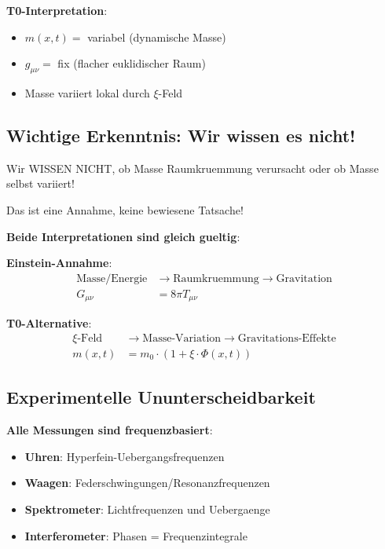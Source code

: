 \documentclass[12pt,a4paper]{article}
\newcommand{\xipar}{\xi}
\theoremstyle{definition}
\theoremstyle{remark}
\begin{document}
	\textbf{T0-Interpretation}:
	\begin{itemize}
		\item $m(x,t) = $ variabel (dynamische Masse)
		\item $g_{\mu\nu} = $ fix (flacher euklidischer Raum)
		\item Masse variiert lokal durch $\xipar$-Feld
	\end{itemize}
	
	\subsection{Wichtige Erkenntnis: Wir wissen es nicht!}
	
	\begin{tcolorbox}[colback=red!5!white,colframe=red!75!black,title=Achtung - Fundamentaler Punkt]
		Wir WISSEN NICHT, ob Masse Raumkruemmung verursacht oder ob Masse selbst variiert!
		
		Das ist eine Annahme, keine bewiesene Tatsache!
	\end{tcolorbox}
	
	\textbf{Beide Interpretationen sind gleich gueltig}:
	
	\textbf{Einstein-Annahme}:
	\begin{align}
		\text{Masse/Energie} &\rightarrow \text{Raumkruemmung} \rightarrow \text{Gravitation} \\
		G_{\mu\nu} &= 8\pi T_{\mu\nu}
	\end{align}
	
	\textbf{T0-Alternative}:
	\begin{align}
		\xipar\text{-Feld} &\rightarrow \text{Masse-Variation} \rightarrow \text{Gravitations-Effekte} \\
		m(x,t) &= m_0 \cdot (1 + \xipar \cdot \Phi(x,t))
	\end{align}
	
	\subsection{Experimentelle Ununterscheidbarkeit}
	
	\textbf{Alle Messungen sind frequenzbasiert}:
	\begin{itemize}
		\item \textbf{Uhren}: Hyperfein-Uebergangsfrequenzen
		\item \textbf{Waagen}: Federschwingungen/Resonanzfrequenzen
		\item \textbf{Spektrometer}: Lichtfrequenzen und Uebergaenge
		\item \textbf{Interferometer}: Phasen = Frequenzintegrale
	\end{itemize}
	
\end{document}
